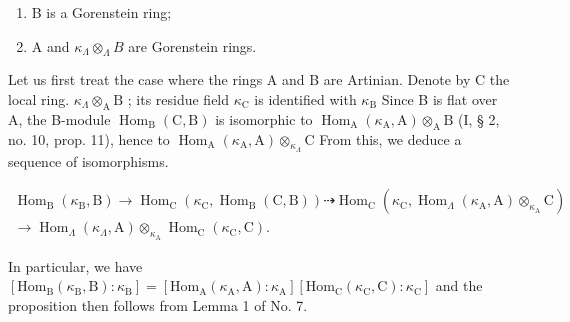 \begin{enumerate}
\def\labelenumi{(\roman{enumi})}
\item
  B is a Gorenstein ring;
\item
  A and \(\kappa_{\Lambda} \otimes_{\Lambda} B\) are Gorenstein rings.
\end{enumerate}

Let us first treat the case where the rings A and B are Artinian. Denote by C the local ring. \(\kappa_{\Lambda} \otimes_{\mathrm{A}} \mathrm{B}\) ; its residue field \(\kappa_{\mathrm{C}}\) is identified with \(\kappa_{\mathrm{B}}\) Since B is flat over A, the B-module \(\operatorname{Hom}_{\mathrm{B}}(\mathrm{C}, \mathrm{B})\) is isomorphic to \(\operatorname{Hom}_{\mathrm{A}}(\kappa_{\mathrm{A}}, \mathrm{A}) \otimes_{\mathrm{A}} \mathrm{B}\) (I, § 2, no. 10, prop. 11), hence to \(\operatorname{Hom}_{\mathrm{A}}(\kappa_{\mathrm{A}}, \mathrm{A}) \otimes_{\kappa_{\Lambda}} \mathrm{C}\) From this, we deduce a sequence of isomorphisms.

\[
\begin{array}{c} \operatorname{Hom} _ {\mathrm{B}} (\kappa_ {\mathrm{B}}, \mathrm{B}) \longrightarrow \operatorname{Hom} _ {\mathrm{C}} (\kappa_ {\mathrm{C}}, \operatorname{Hom} _ {\mathrm{B}} (\mathrm{C}, \mathrm{B})) \dashrightarrow \operatorname{Hom} _ {\mathrm{C}} (\kappa_ {\mathrm{C}}, \operatorname{Hom} _ {\Lambda} (\kappa_ {\mathrm{A}}, \mathrm{A}) \otimes_ {\kappa_ {\mathrm{A}}} \mathrm{C}) \\ \longrightarrow \operatorname{Hom} _ {\Lambda} (\kappa_ {\Lambda}, \mathrm{A}) \otimes_ {\kappa_ {\mathrm{A}}} \operatorname{Hom} _ {\mathrm{C}} (\kappa_ {\mathrm{C}}, \mathrm{C}). \end{array}
\]

In particular, we have \(\left[\mathrm{Hom}_{\mathrm{B}}(\kappa_{\mathrm{B}},\mathrm{B}):\kappa_{\mathrm{B}}\right] = \left[\mathrm{Hom}_{\mathrm{A}}(\kappa_{\mathrm{A}},\mathrm{A}):\kappa_{\mathrm{A}}\right]\left[\mathrm{Hom}_{\mathrm{C}}(\kappa_{\mathrm{C}},\mathrm{C}):\kappa_{\mathrm{C}}\right]\) and the proposition then follows from Lemma 1 of No. 7.

